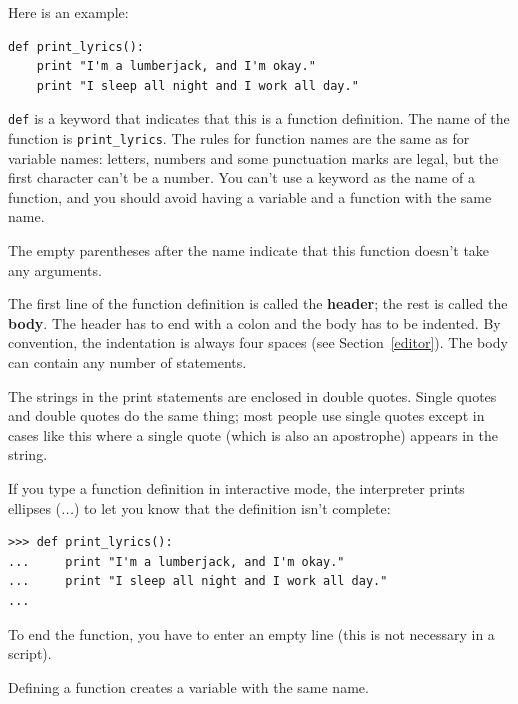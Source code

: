 \documentclass[10pt]{book}
\begin{document}

Here is an example:

\beforeverb
\begin{verbatim}
def print_lyrics():
    print "I'm a lumberjack, and I'm okay."
    print "I sleep all night and I work all day."
\end{verbatim}
\afterverb
%
{\tt def} is a keyword that indicates that this is a function
definition.  The name of the function is \verb"print_lyrics".  The
rules for function names are the same as for variable names: letters,
numbers and some punctuation marks are legal, but the first character
can't be a number.  You can't use a keyword as the name of a function,
and you should avoid having a variable and a function with the same
name.


The empty parentheses after the name indicate that this function
doesn't take any arguments.


The first line of the function definition is called the {\bf header};
the rest is called the {\bf body}.  The header has to end with a colon
and the body has to be indented.  By convention, the indentation is
always four spaces (see Section~\ref{editor}).  The body can contain
any number of statements.

The strings in the print statements are enclosed in double
quotes.  Single quotes and double quotes do the same thing;
most people use single quotes except in cases like this where
a single quote (which is also an apostrophe) appears in the string.


If you type a function definition in interactive mode, the interpreter
prints ellipses ({\em ...}) to let you know that the definition
isn't complete:

\beforeverb
\begin{verbatim}
>>> def print_lyrics():
...     print "I'm a lumberjack, and I'm okay."
...     print "I sleep all night and I work all day."
...
\end{verbatim}
\afterverb
%
To end the function, you have to enter an empty line (this is
not necessary in a script).

Defining a function creates a variable with the same name.
\end{document}

